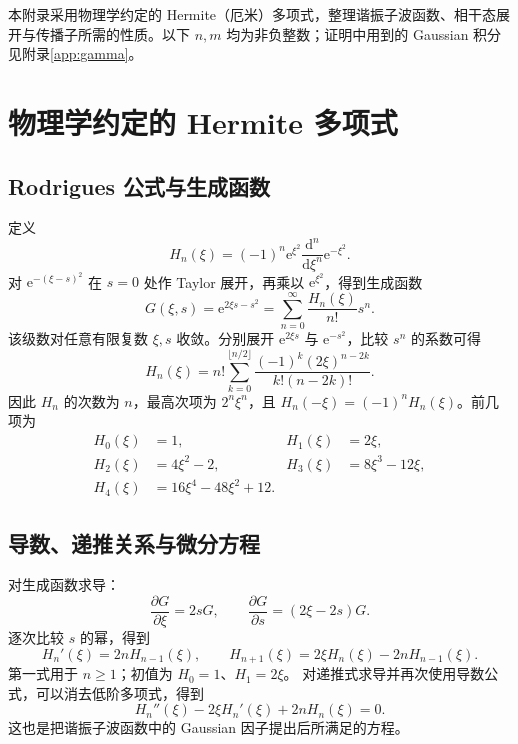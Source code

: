 \label{app:hermite}
本附录采用物理学约定的 Hermite（厄米）多项式，整理谐振子波函数、相干态展开与传播子所需的性质。以下 $n,m$ 均为非负整数；证明中用到的 Gaussian 积分见附录\ref{app:gamma}。

\section{物理学约定的 Hermite 多项式}
\subsection{Rodrigues 公式与生成函数}
定义
\begin{equation}
\boxed{H_n\left(\xi\right)
=\left(-1\right)^n\mathrm{e}^{\xi^2}
\frac{\mathrm{d}^n}{\mathrm{d}\xi^n}\mathrm{e}^{-\xi^2}.}
\label{eq:app-hermite-rodrigues}
\end{equation}
对 $\mathrm{e}^{-\left(\xi-s\right)^2}$ 在 $s=0$ 处作 Taylor 展开，再乘以
$\mathrm{e}^{\xi^2}$，得到生成函数
\begin{equation}
\boxed{G\left(\xi,s\right)
=\mathrm{e}^{2\xi s-s^2}
=\sum_{n=0}^{\infty}\frac{H_n\left(\xi\right)}{n!}s^n.}
\label{eq:app-hermite-generating}
\end{equation}
该级数对任意有限复数 $\xi,s$ 收敛。分别展开
$\mathrm{e}^{2\xi s}$ 与 $\mathrm{e}^{-s^2}$，比较 $s^n$ 的系数可得
\begin{equation}
H_n\left(\xi\right)
=n!\sum_{k=0}^{\lfloor n/2\rfloor}
\frac{\left(-1\right)^k\left(2\xi\right)^{n-2k}}{k!\left(n-2k\right)!}.
\end{equation}
因此 $H_n$ 的次数为 $n$，最高次项为 $2^n\xi^n$，且
$H_n\left(-\xi\right)=\left(-1\right)^nH_n\left(\xi\right)$。前几项为
\begin{align}
H_0\left(\xi\right)&=1,& H_1\left(\xi\right)&=2\xi,\\
H_2\left(\xi\right)&=4\xi^2-2,& H_3\left(\xi\right)&=8\xi^3-12\xi,\\
H_4\left(\xi\right)&=16\xi^4-48\xi^2+12.
\end{align}

\subsection{导数、递推关系与微分方程}
对生成函数求导：
\begin{equation}
\frac{\partial G}{\partial\xi}=2sG,
\qquad
\frac{\partial G}{\partial s}=\left(2\xi-2s\right)G.
\end{equation}
逐次比较 $s$ 的幂，得到
\begin{equation}
\boxed{H_n'\left(\xi\right)=2nH_{n-1}\left(\xi\right),\qquad
H_{n+1}\left(\xi\right)=2\xi H_n\left(\xi\right)-2nH_{n-1}\left(\xi\right).}
\label{eq:app-hermite-recurrence}
\end{equation}
第一式用于 $n\geq1$；初值为 $H_0=1$、$H_1=2\xi$。
对递推式求导并再次使用导数公式，可以消去低阶多项式，得到
\begin{equation}
\boxed{H_n''\left(\xi\right)-2\xi H_n'\left(\xi\right)+2nH_n\left(\xi\right)=0.}
\label{eq:app-hermite-ode}
\end{equation}
这也是把谐振子波函数中的 Gaussian 因子提出后所满足的方程。

